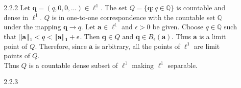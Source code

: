 \documentclass[../../Solutions.tex]{subfiles}
\begin{document}
\begin{itemize}
	\item [2.2.2] Let $\mathbf{q} = (q,0,0,\dots) \in \ell^1$.
		The set $Q = \{\mathbf{q} : q \in \mathbb{Q} \}$ is countable and dense in $\ell^1$.
		$Q$ is in one-to-one correspondence with the countable set $\mathbb{Q}$ under the mapping $\mathbf{q} \to q$.
		Let $\mathbf{a} \in \ell^1$ and $\epsilon > 0$ be given.
		Choose $q \in \mathbb{Q}$ such that $\left\lVert\mathbf{a}\right\rVert_1 < q < \left\lVert\mathbf{a}\right\rVert_1 + \epsilon$.
		Then $\mathbf{q} \in Q$ and $\mathbf{q} \in B_\epsilon(\mathbf{a})$.
		Thus $\mathbf{a}$ is a limit point of $Q$.
		Therefore, since $\mathbf{a}$ is arbitrary, all the points of $\ell^1$ are limit points of $Q$. \\
		Thus $Q$ is a countable dense subset of $\ell^1$ making $\ell^1$ separable.
	
	\item [2.2.3] 
	
\end{itemize}
\end{document}
